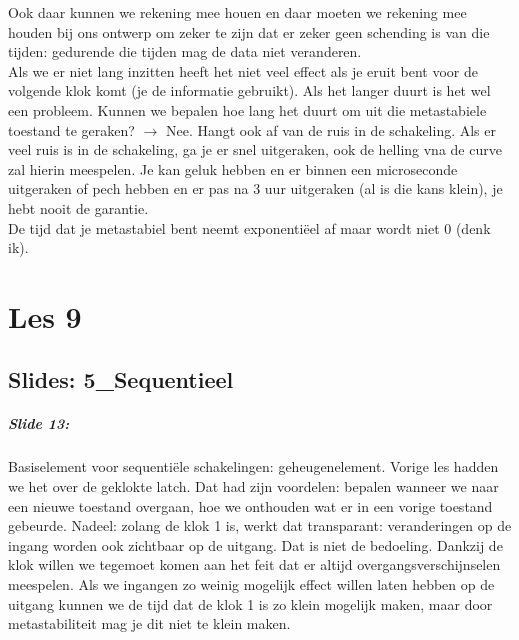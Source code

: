 \documentclass[10pt,a4paper]{book}
\begin{document}
Ook daar kunnen we rekening mee houen en daar moeten we rekening mee houden bij ons ontwerp om zeker te zijn dat er zeker geen schending is van die tijden: gedurende die tijden mag de data niet veranderen.\\
Als we er niet lang inzitten heeft het niet veel effect als je eruit bent voor de volgende klok komt (je de informatie gebruikt). Als het langer duurt is het wel een probleem. Kunnen we bepalen hoe lang het duurt om uit die metastabiele toestand te geraken? $\rightarrow$ Nee. Hangt ook af van de ruis in de schakeling. Als er veel ruis is in de schakeling, ga je er snel uitgeraken, ook de helling vna de curve zal hierin meespelen. Je kan geluk hebben en er binnen een microseconde uitgeraken of pech hebben en er pas na 3 uur uitgeraken (al is die kans klein), je hebt nooit de garantie.\\
De tijd dat je metastabiel bent neemt exponenti\"eel af maar wordt niet 0 (denk ik).

\chapter{Les 9}

\section{Slides: 5\_Sequentieel} 

\paragraph{Slide 13:} Basiselement voor sequenti\"ele schakelingen: geheugenelement. Vorige les hadden we het over de geklokte latch. Dat had zijn voordelen: bepalen wanneer we naar een nieuwe toestand overgaan, hoe we onthouden wat er in een vorige toestand gebeurde. Nadeel: zolang de klok 1 is, werkt dat transparant: veranderingen op de ingang worden ook zichtbaar op de uitgang. Dat is niet de bedoeling. Dankzij de klok willen we tegemoet komen aan het feit dat er altijd overgangsverschijnselen meespelen. Als we ingangen zo weinig mogelijk effect willen laten hebben op de uitgang kunnen we de tijd dat de klok 1 is zo klein mogelijk maken, maar door metastabiliteit mag je dit niet te klein maken.
\end{document}
